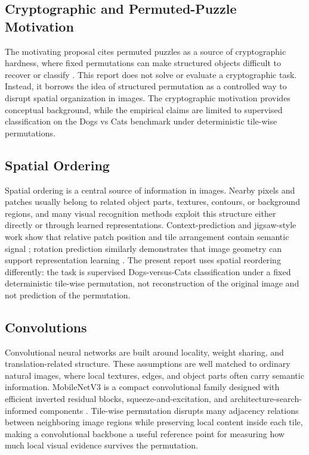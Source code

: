 \documentclass[12pt]{article}
\begin{document}
\subsection{Cryptographic and Permuted-Puzzle Motivation}

The motivating proposal cites permuted puzzles as a source of cryptographic hardness, where fixed permutations can make structured objects difficult to recover or classify \citep{boyle2019permuted}. This report does not solve or evaluate a cryptographic task. Instead, it borrows the idea of structured permutation as a controlled way to disrupt spatial organization in images. The cryptographic motivation provides conceptual background, while the empirical claims are limited to supervised classification on the Dogs vs Cats benchmark under deterministic tile-wise permutations.

\subsection{Spatial Ordering}

Spatial ordering is a central source of information in images. Nearby pixels and patches usually belong to related object parts, textures, contours, or background regions, and many visual recognition methods exploit this structure either directly or through learned representations. Context-prediction and jigsaw-style work show that relative patch position and tile arrangement contain semantic signal \citep{doersch2015unsupervised,noroozi2016unsupervised}; rotation prediction similarly demonstrates that image geometry can support representation learning \citep{gidaris2018unsupervised}. The present report uses spatial reordering differently: the task is supervised Dogs-versus-Cats classification under a fixed deterministic tile-wise permutation, not reconstruction of the original image and not prediction of the permutation.

\subsection{Convolutions}

Convolutional neural networks are built around locality, weight sharing, and translation-related structure. These assumptions are well matched to ordinary natural images, where local textures, edges, and object parts often carry semantic information. MobileNetV3 is a compact convolutional family designed with efficient inverted residual blocks, squeeze-and-excitation, and architecture-search-informed components \citep{howard2019searching}. Tile-wise permutation disrupts many adjacency relations between neighboring image regions while preserving local content inside each tile, making a convolutional backbone a useful reference point for measuring how much local visual evidence survives the permutation.
\end{document}
